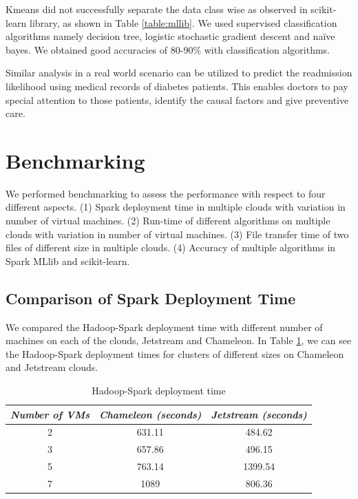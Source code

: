 \documentclass[9pt,twocolumn,twoside]{../../styles/osajnl}
\begin{document}
Kmeans did not successfully separate the data class wise as observed in scikit-learn library, as shown in Table \ref{table:mllib}.  We used  supervised classification algorithms namely decision tree, logistic stochastic gradient descent and naïve bayes. We obtained good accuracies of 80-90$\%$ with classification algorithms.

Similar analysis in a real world scenario can be utilized to predict the readmission likelihood using medical records of diabetes patients. This enables doctors to  pay special attention to those patients, identify the causal factors and give preventive care.



\section{Benchmarking}
 We performed benchmarking to assess the performance with respect to four different aspects. (1) Spark deployment time in multiple clouds with variation in number of virtual machines. (2) Run-time of different algorithms on multiple clouds with variation in number of virtual machines. (3) File transfer time of two files of different size in multiple clouds.
 (4) Accuracy of multiple algorithms in Spark MLlib and scikit-learn.

\subsection{Comparison of Spark Deployment Time}

We compared the Hadoop-Spark deployment time with different number of machines on each of the clouds, Jetstream and Chameleon. In Table \ref{table:finalspdeployment}, we can see  the Hadoop-Spark deployment times for clusters of different sizes on Chameleon and Jetstream clouds.

\begin{table}[h!]
\centering
\caption{Hadoop-Spark deployment time}
 \begin{tabular}{|c|c c|} 
 \hline
 \textit{Number of VMs}  & \textit{Chameleon (seconds)} & \textit{Jetstream (seconds)}\\
 \hline
 \hline 
2 & 631.11 & 484.62\\
3 & 657.86 & 496.15\\
5 & 763.14 & 1399.54\\
7 & 1089 & 806.36\\
\hline 
\end{tabular}
\label{table:finalspdeployment}
\end{table}
\end{document}
